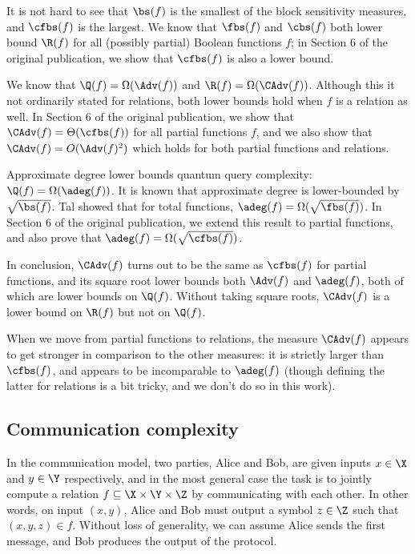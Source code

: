 It is not hard to see that $\bs(f)$ is the smallest
of the block sensitivity measures, and $\cfbs(f)$ is
the largest. We know \cite{Aar08,HN12}
that $\fbs(f)$ and $\cbs(f)$ both lower bound $\R(f)$
for all (possibly partial) Boolean functions $f$;
in Section 6 of the original publication, we show that $\cfbs(f)$ is also
a lower bound.

We know \cite{LM08,SS06,AKPV18} that
$\Q(f)=\Omega(\Adv(f))$ and $\R(f)=\Omega(\CAdv(f))$.
Although this it not ordinarily stated for relations,
both lower bounds hold when $f$ is a relation as well.
In Section 6 of the original publication, we show that
$\CAdv(f)=\Theta(\cfbs(f))$
for all partial functions $f$,
and we also show that
$\CAdv(f)=O(\Adv(f)^2)$
which holds for both partial functions and relations.

Approximate degree lower bounds quantum query complexity:
$\Q(f)=\Omega(\adeg(f))$.
It is known \cite{BBC+01} that approximate
degree is lower-bounded by $\sqrt{\bs(f)}$.
Tal \cite{Tal13} showed that for total functions,
$\adeg(f)=\Omega(\sqrt{\fbs(f)})$.
In Section 6 of the original publication, we extend this result to partial
functions, and also prove that
$\adeg(f)=\Omega(\sqrt{\cfbs(f)})$.

In conclusion, $\CAdv(f)$ turns out to be the same
as $\cfbs(f)$ for partial functions,
and its square root lower bounds both
$\Adv(f)$ and $\adeg(f)$, both of which are lower bounds
on $\Q(f)$. Without taking square roots,
$\CAdv(f)$ is a lower bound on $\R(f)$
but not on $\Q(f)$.

When we move from partial functions
to relations, the measure $\CAdv(f)$ appears to get stronger
in comparison to the other measures: it is
strictly larger than $\cfbs(f)$, and appears to be
incomparable to $\adeg(f)$ (though defining the
latter for relations is a bit tricky, and we don't
do so in this work).


\subsection{Communication complexity}

In the communication model, two parties, Alice and Bob, are given inputs $x\in\X$ and $y\in\Y$ respectively, and in the most general case the task is to jointly compute a relation $f\subseteq \X\times\Y\times\Z$ by communicating with each other. In other words, on input $(x,y)$,
Alice and Bob must output a symbol
$z\in\Z$ such that $(x,y,z)\in f$.
Without loss of generality, we can assume Alice sends the first message, and Bob produces the output of the protocol.

